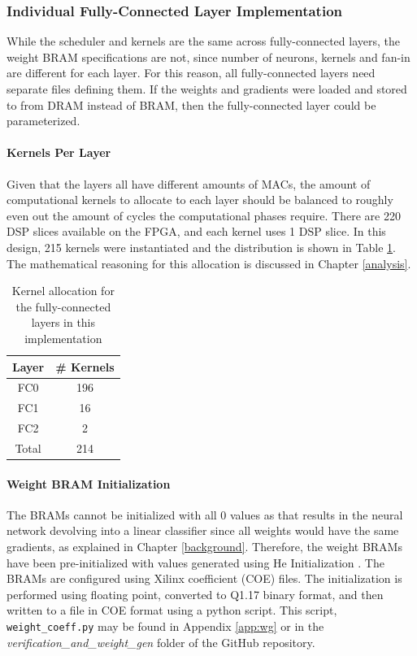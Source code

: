 \subsubsection{Individual Fully-Connected Layer Implementation}
While the scheduler and kernels are the same across fully-connected layers, the weight BRAM specifications are not, since number of neurons, kernels and fan-in are different for each layer. For this reason, all fully-connected layers need separate files defining them. If the weights and gradients were loaded and stored to from DRAM instead of BRAM, then the fully-connected layer could be parameterized.

\paragraph{Kernels Per Layer}
Given that the layers all have different amounts of MACs, the amount of computational kernels to allocate to each layer should be balanced to roughly even out the amount of cycles the computational phases require. There are 220 DSP slices available on the FPGA, and each kernel uses 1 DSP slice. In this design, 215 kernels were instantiated and the distribution is shown in Table \ref{dsp-alloc}. The mathematical reasoning for this allocation is discussed in Chapter \ref{analysis}.
\begin{table}
	\centering
	\begin{tabular}{| c | c |}
		\hline
		\textbf{Layer} & \textbf{\# Kernels} \\\hline
		FC0 & 196 \\\hline 
		FC1 & 16 \\\hline 
		FC2 & 2 \\\hline	
		Total & 214 \\\hline	
	\end{tabular}
	\caption{Kernel allocation for the fully-connected layers in this implementation}
	\label{dsp-alloc}
\end{table}

\paragraph{Weight BRAM Initialization}
The BRAMs cannot be initialized with all 0 values as that results in the neural network devolving into a linear classifier since all weights would have the same gradients, as explained in Chapter \ref{background}. Therefore, the weight BRAMs have been pre-initialized with values generated using He Initialization \cite{HeZR015}. The BRAMs are configured using Xilinx coefficient (COE) files. The initialization is performed using floating point, converted to Q1.17 binary format, and then written to a file in COE format using a python script. This script, \texttt{weight\_coeff.py} may be found in Appendix \ref{app:wg} or in the \textit{verification\_and\_weight\_gen} folder of the GitHub repository.

